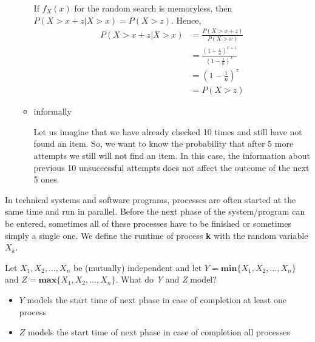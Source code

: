 \documentclass{homework}
\begin{document}
\begin{enumerate}
\begin{itemize}
		If $f_X(x)$ for the random search is memoryless, then $P(X > x + z | X > x) = P(X > z)$. Hence, 
		\begin{align*}
		P(X > x + z | X > x) &= \frac{P(X > x + z)}{P(X > x)} \\
		&= \frac{(1-\frac{1}{n})^{x + z}}{(1 - \frac{1}{n})^{x}} \\
		&= (1-\frac{1}{n})^z \\
		&= P(X>z)
		\end{align*}
		\item informally
		
		Let us imagine that we have already checked 10 times and still have not found an item. So, we want to know the probability that after 5 more attempts we still will not find an item. In this case, the information about previous 10 unsuccessful attempts does not affect the outcome of the next 5 ones.
	\end{itemize}
\end{enumerate}

\exercise*
In technical systems and software programs, processes are often started at the same time and run in parallel. Before the next phase of the system/program can be entered, sometimes all of these processes have to be finished or sometimes simply a single one. We define the runtime of process \textbf{k} with the random variable $X_k$.

Let $X_1, X_2,\dots,X_n$ be (mutually) independent and let $Y = \textbf{min}\{X_1, X_2,\dots,X_n\}$ and \newline $Z = \textbf{max}\{X_1, X_2,\dots,X_n\}$. What do \emph{Y} and \emph{Z} model?

\begin{itemize}
	\item $Y$ models the start time of next phase in case of completion at least one process
	\item $Z$ models the start time of next phase in case of completion all processes
\end{itemize}
\end{document}
